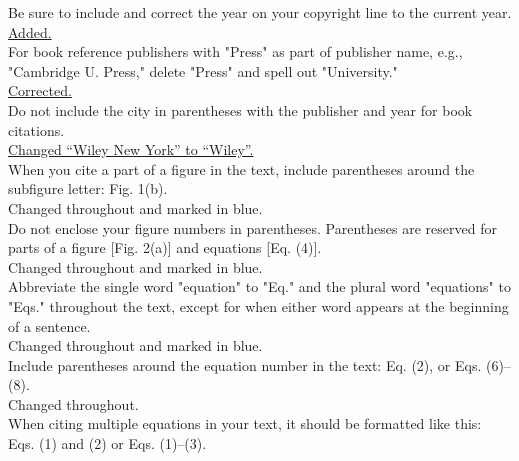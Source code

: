 \documentclass[10pt]{article}
\begin{document}
{\color{OE} Be sure to include and correct the year on your copyright line to
  the current year.}\\

\hyperlink{copyright}{\color{urlblue} Added.}\\

{\color{OE} For book reference publishers with "Press" as part of publisher
  name, e.g., "Cambridge U. Press," delete "Press" and spell out "University."}\\

\hyperlink{press}{\color{urlblue} Corrected.}\\

{\color{OE} Do not include the city in parentheses with the publisher and year
  for book citations.}\\

\hyperlink{wiley}{\color{urlblue} Changed ``Wiley New York'' to ``Wiley''.}\\

{\color{OE} When you cite a part of a figure in the text, include parentheses
  around the subfigure letter: Fig. 1(b).}\\

Changed throughout and marked in blue.\\

{\color{OE} Do not enclose your figure numbers in parentheses. Parentheses are
  reserved for parts of a figure [Fig. 2(a)] and equations [Eq. (4)].}\\

Changed throughout and marked in blue.\\

{\color{OE} Abbreviate the single word "equation" to "Eq." and the plural word
  "equations" to "Eqs." throughout the text, except for when either word appears
  at the beginning of a sentence.}\\

Changed throughout and marked in blue.\\

{\color{OE} Include parentheses around the equation number in the text:
  Eq. (2), or Eqs. (6)--(8).}\\

Changed throughout.\\

{\color{OE} When citing multiple equations in your text, it should be
  formatted like this: Eqs. (1) and (2) or Eqs. (1)--(3).}\\
\end{document}
